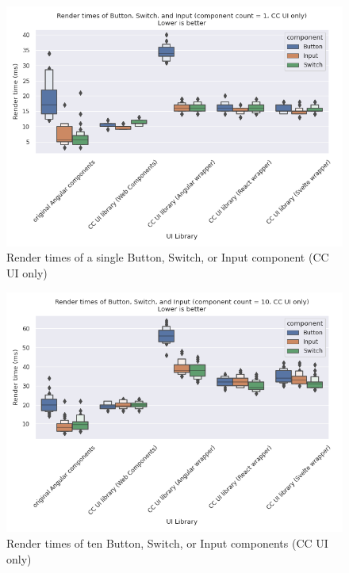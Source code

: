 \begin{figure}[h]
  \includegraphics[width=\columnwidth]{plots/render-time-cow-1.png}
  \caption{Render times of a single Button, Switch, or Input component (CC UI only)}
  \label{fig:results:render-time-cow-1}
  \centering
\end{figure}

\begin{figure}[h]
  \includegraphics[width=\columnwidth]{plots/render-time-cow-10.png}
  \caption{Render times of ten Button, Switch, or Input components (CC UI only)}
  \label{fig:results:render-time-cow-10}
  \centering
\end{figure}

